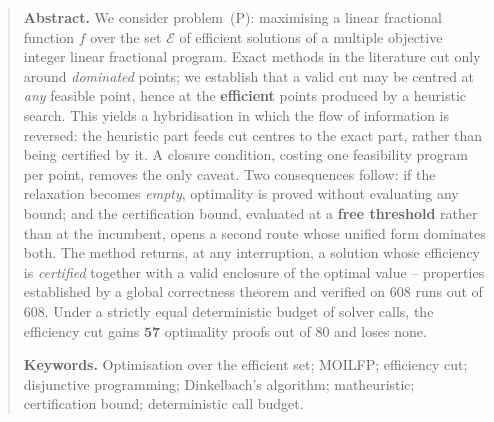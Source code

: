 \documentclass[11pt,a4paper]{article}
\theoremstyle{plain}
\theoremstyle{remark}
\newcommand{\Ecal}{\mathcal{E}}
\begin{document}
\begin{abstract}
\medskip
\noindent\textbf{Abstract.} We consider problem~(P): maximising a linear
fractional function $f$ over the set $\Ecal$ of efficient solutions of a
multiple objective integer linear fractional program. Exact methods in the
literature cut only around \emph{dominated} points; we establish that a
valid cut may be centred at \emph{any} feasible point, hence at the
\textbf{efficient} points produced by a heuristic search. This yields a
hybridisation in which the flow of information is reversed: the heuristic
part feeds cut centres to the exact part, rather than being certified by
it. A closure condition, costing one feasibility program per point,
removes the only caveat. Two consequences follow: if the relaxation becomes
\emph{empty}, optimality is proved without evaluating any bound; and the
certification bound, evaluated at a \textbf{free threshold} rather than at
the incumbent, opens a second route whose unified form dominates both. The
method returns, at any interruption, a solution whose efficiency is
\emph{certified} together with a valid enclosure of the optimal value --
properties established by a global correctness theorem and verified on
$608$ runs out of $608$. Under a strictly equal deterministic budget of
solver calls, the efficiency cut gains $\mathbf{57}$ optimality proofs out
of $80$ and loses none.

\medskip
\noindent\textbf{Keywords.} Optimisation over the efficient set; MOILFP;
efficiency cut; disjunctive programming; Dinkelbach's algorithm;
matheuristic; certification bound; deterministic call budget.
\end{abstract}

\tableofcontents
\bigskip

\listoftables
\bigskip

\listoffigures
\bigskip

\end{document}
